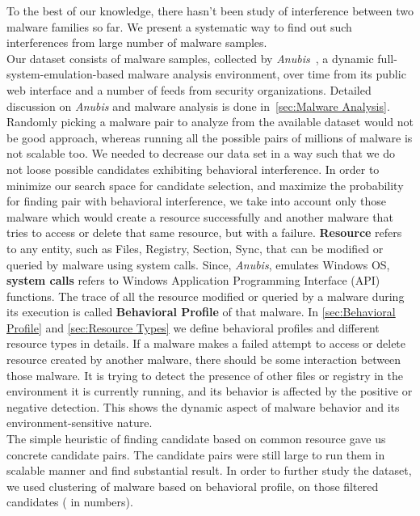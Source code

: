 To the best of our knowledge, there hasn't been study of interference between two malware families so far.
We present a systematic way to find out such interferences from large number of malware samples.\\
Our dataset consists of {\gettotalmalwarei{}} malware samples, collected by \emph{Anubis}~\cite[]{anubis}, a dynamic full-system-emulation-based malware analysis environment, over time from its public web interface and a number of feeds from security organizations.
Detailed discussion on \emph{Anubis} and malware analysis is done in~\autoref{sec:Malware Analysis}.
Randomly picking a malware pair to analyze from the available dataset would not be good approach, whereas running all the possible pairs of millions of malware is not scalable too.
We needed to decrease our data set in a way such that we do not loose possible candidates exhibiting behavioral interference.
In order to minimize our search space for candidate selection, and maximize the probability for finding pair with behavioral interference, we take into account only those malware which would create a resource successfully and another malware that tries to access or delete that same resource, but with a failure.
\textbf{Resource} refers to any entity, such as Files, Registry, Section, Sync, that can be modified or queried by malware using system calls.
Since, \emph{Anubis}, emulates Windows OS, \textbf{system calls} refers to Windows Application Programming Interface (API) functions.
The trace of all the resource modified or queried by a malware during its execution is called \textbf{Behavioral Profile} of that malware.
In \autoref{sec:Behavioral Profile} and \autoref{sec:Resource Types} we define behavioral profiles and different resource types in details.
If a malware makes a failed attempt to access or delete resource created by another malware, there should be some interaction between those malware.
It is trying to detect the presence of other files or registry in the environment it is currently running, and its behavior is affected by the positive or negative detection.
This shows the dynamic aspect of malware behavior and its environment-sensitive nature.\\
The simple heuristic of finding candidate based on common resource gave us concrete candidate pairs.
The candidate pairs were still large to run them in scalable manner and find substantial result.
In order to further study the dataset, we used clustering of malware based on behavioral profile, on those filtered candidates (\gettotalmalwareiii{} in numbers).

